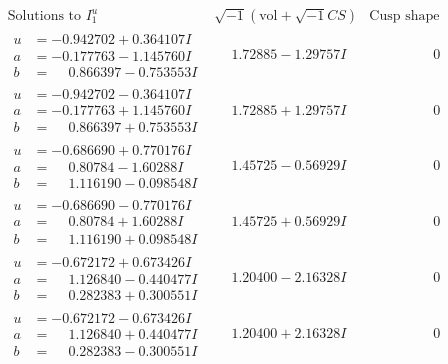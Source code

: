 \documentclass[1p]{elsarticle_modified}
\theoremstyle{definition}
\newcommand{\I}{\sqrt{-1}}
\begin{document}
$$\begin{array}{c|c|c}  
\text{Solutions to }I^u_{1}& \I (\text{vol} + \sqrt{-1}CS) & \text{Cusp shape}\\
 \hline 
\begin{aligned}
u &= -0.942702 + 0.364107 I \\
a &= -0.177763 - 1.145760 I \\
b &= \phantom{-}0.866397 - 0.753553 I\end{aligned}
 & \phantom{-}1.72885 - 1.29757 I & \phantom{-0.000000 } 0 \\ \hline\begin{aligned}
u &= -0.942702 - 0.364107 I \\
a &= -0.177763 + 1.145760 I \\
b &= \phantom{-}0.866397 + 0.753553 I\end{aligned}
 & \phantom{-}1.72885 + 1.29757 I & \phantom{-0.000000 } 0 \\ \hline\begin{aligned}
u &= -0.686690 + 0.770176 I \\
a &= \phantom{-}0.80784 - 1.60288 I \\
b &= \phantom{-}1.116190 - 0.098548 I\end{aligned}
 & \phantom{-}1.45725 - 0.56929 I & \phantom{-0.000000 } 0 \\ \hline\begin{aligned}
u &= -0.686690 - 0.770176 I \\
a &= \phantom{-}0.80784 + 1.60288 I \\
b &= \phantom{-}1.116190 + 0.098548 I\end{aligned}
 & \phantom{-}1.45725 + 0.56929 I & \phantom{-0.000000 } 0 \\ \hline\begin{aligned}
u &= -0.672172 + 0.673426 I \\
a &= \phantom{-}1.126840 - 0.440477 I \\
b &= \phantom{-}0.282383 + 0.300551 I\end{aligned}
 & \phantom{-}1.20400 - 2.16328 I & \phantom{-0.000000 } 0 \\ \hline\begin{aligned}
u &= -0.672172 - 0.673426 I \\
a &= \phantom{-}1.126840 + 0.440477 I \\
b &= \phantom{-}0.282383 - 0.300551 I\end{aligned}
 & \phantom{-}1.20400 + 2.16328 I & \phantom{-0.000000 } 0 \\ \hline\begin{aligned}

\end{aligned}
\end{array}$$
\end{document}

